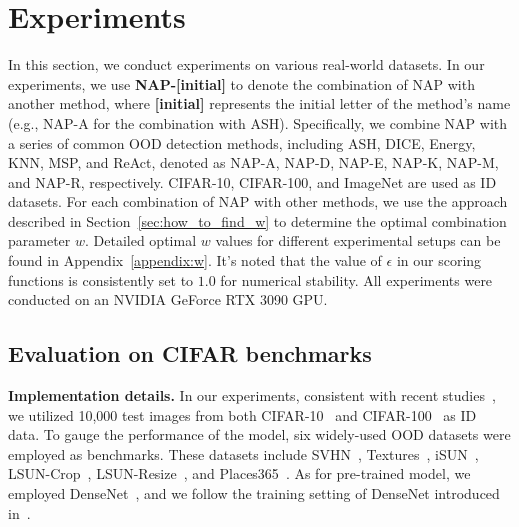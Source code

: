 \section{Experiments}
\label{sec:exp}
In this section, we conduct experiments on various real-world datasets. In our experiments, we use \textbf{NAP-[initial]} to denote the combination of NAP with another method, where \textbf{[initial]} represents the initial letter of the method's name (e.g., NAP-A for the combination with ASH). Specifically, we combine NAP with a series of common OOD detection methods, including ASH, DICE, Energy, KNN, MSP, and ReAct, denoted as NAP-A, NAP-D, NAP-E, NAP-K, NAP-M, and NAP-R, respectively. CIFAR-10, CIFAR-100, and ImageNet are used as ID datasets. For each combination of NAP with other methods, we use the approach described in Section~\ref{sec:how_to_find_w} to determine the optimal combination parameter \( w \). Detailed optimal \( w \) values for different experimental setups can be found in Appendix~\ref{appendix:w}. It's noted that the value of $\epsilon$ in our scoring functions is consistently set to $1.0$ for numerical stability. All experiments were conducted on an NVIDIA GeForce RTX 3090 GPU.

\subsection{Evaluation on CIFAR benchmarks}
\noindent \textbf{Implementation details.} In our experiments, consistent with recent studies~\cite{sun2021react, sun2022dice, djurisic2022extremely}, we utilized 10,000 test images from both CIFAR-10~\cite{krizhevsky2009cifar} and CIFAR-100~\cite{krizhevsky2009cifar} as ID data. To gauge the performance of the model, six widely-used OOD datasets were employed as benchmarks. These datasets include SVHN~\cite{netzer2011svhn}, Textures~\cite{cimpoi2014texture}, iSUN~\cite{xu2015isun}, LSUN-Crop~\cite{yu2015lsun}, LSUN-Resize~\cite{yu2015lsun}, and Places365~\cite{zhou2017places}. As for pre-trained model, we employed DenseNet~\cite{huang2017densely}, and we follow the training setting of DenseNet introduced in~\cite{sun2022dice}. 

